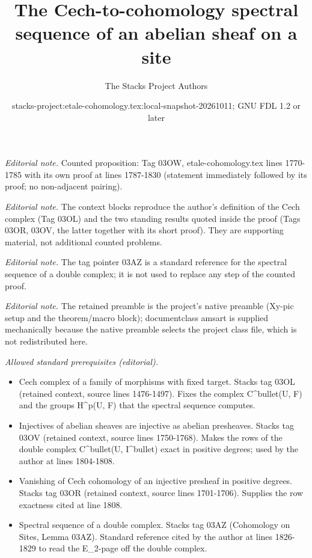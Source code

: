 \documentclass[10pt,a4paper]{amsart}
\title{The Cech-to-cohomology spectral sequence of an abelian sheaf on a site}
\author{The Stacks Project Authors}
\date{stacks-project:etale-cohomology.tex:local-snapshot-20261011; GNU FDL 1.2 or later}
\theoremstyle{plain}
\theoremstyle{definition}
\theoremstyle{remark}
\numberwithin{equation}{subsection}
\begin{document}
\maketitle
\noindent\textit{Editorial note.} Counted proposition: Tag 03OW, etale-cohomology.tex lines 1770-1785 with its own proof at lines 1787-1830 (statement immediately followed by its proof; no non-adjacent pairing).\par\medskip
\noindent\textit{Editorial note.} The context blocks reproduce the author's definition of the Cech complex (Tag 03OL) and the two standing results quoted inside the proof (Tags 03OR, 03OV, the latter together with its short proof). They are supporting material, not additional counted problems.\par\medskip
\noindent\textit{Editorial note.} The tag pointer 03AZ is a standard reference for the spectral sequence of a double complex; it is not used to replace any step of the counted proof.\par\medskip
\noindent\textit{Editorial note.} The retained preamble is the project's native preamble (Xy-pic setup and the theorem/macro block); documentclass amsart is supplied mechanically because the native preamble selects the project class file, which is not redistributed here.\par\medskip
\noindent\textit{Allowed standard prerequisites (editorial).}\begin{itemize}
\item Cech complex of a family of morphisms with fixed target. Stacks tag 03OL (retained context, source lines 1476-1497). Fixes the complex C\textasciicircum{}bullet(U, F) and the groups H\textasciicircum{}p(U, F) that the spectral sequence computes.
\item Injectives of abelian sheaves are injective as abelian presheaves. Stacks tag 03OV (retained context, source lines 1750-1768). Makes the rows of the double complex C\textasciicircum{}bullet(U, I\textasciicircum{}bullet) exact in positive degrees; used by the author at lines 1804-1808.
\item Vanishing of Cech cohomology of an injective presheaf in positive degrees. Stacks tag 03OR (retained context, source lines 1701-1706). Supplies the row exactness cited at line 1808.
\item Spectral sequence of a double complex. Stacks tag 03AZ (Cohomology on Sites, Lemma 03AZ). Standard reference cited by the author at lines 1826-1829 to read the E\_2-page off the double complex.
\end{itemize}\medskip
\end{document}
